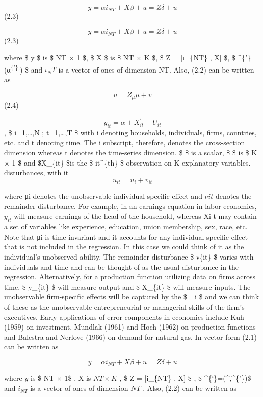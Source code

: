 \documentclass[
]{book}
\begin{document}
\[ y= \alpha i_{NT} + X \beta + u = Z \delta + u      \] (2.3)

\[ y= \alpha i_{NT} + X \beta + u = Z \delta + u      \] (2.3)

where \$ y \$ is \$ NT × 1 \$, \$ X \$ is \$ NT × K \$, \$ Z = {[}ι\_\{NT\} , X{]} \$, \$ \delta\^{}\{'\} = (α\textsuperscript{\{'\},}) \$ and \(ι_NT\) is a vector of ones of dimension NT. Also, (2.2) can be written as

\[ u=Z_\mu \mu +v  \] (2.4)

\[  y_{it} = \alpha + X_{it}^{'} + U_{it}   \] , \$ i=1,\ldots,N ; t=1,\ldots,T \$ with i denoting households, individuals, firms, countries, etc. and t denoting time. The i subscript, therefore, denotes the cross-section dimension whereas t denotes the time-series dimension. \$ \alpha \$ is a scalar, \$ \beta \$ is \$ K × 1 \$ and \$X\_\{it\} \$is the \$ it\^{}\{th\} \$ observation on K explanatory variables. disturbances, with it \[ u_{it}=u_i  + v_{it}     \]

where μi denotes the unobservable individual-specific effect and \(ν{it}\) denotes the remainder disturbance. For example, in an earnings equation in labor economics, \(y_{it}\) will measure earnings of the head of the household, whereas Xi t may contain a set of variables like experience, education, union membership, sex, race, etc. Note that μi is time-invariant and it accounts for any individual-specific effect that is not included in the regression. In this case we could think of it as the individual's unobserved ability. The remainder disturbance \$ ν\{it\} \$ varies with individuals and time and can be thought of as the usual disturbance in the regression. Alternatively, for a production function utilizing data on firms across time, \$ y\_\{it\} \$ will measure output and \$ X\_\{it\} \$ will measure inputs. The unobservable firm-specific effects will be captured by the \$ \mu\_i \$ and we can think of these as the unobservable entrepreneurial or managerial skills of the firm's executives. Early applications of error components in economics include Kuh (1959) on investment, Mundlak (1961) and Hoch (1962) on production functions and Balestra and Nerlove (1966) on demand for natural gas. In vector form (2.1) can be written as

\[ y= \alpha i_{NT}  + X\beta +u = Z\delta + u \]

where \(y\) is \$ NT × 1\$ , X is \(NT × K\) , \$ Z = {[}i\_\{NT\} , X{]} \$ , \$ \delta\^{}\{`\}=(\^{},\beta\^{}\{'\})\$ and \(i_{NT}\) is a vector of ones of dimension \(NT\) . Also, (2.2) can be written as
\end{document}
